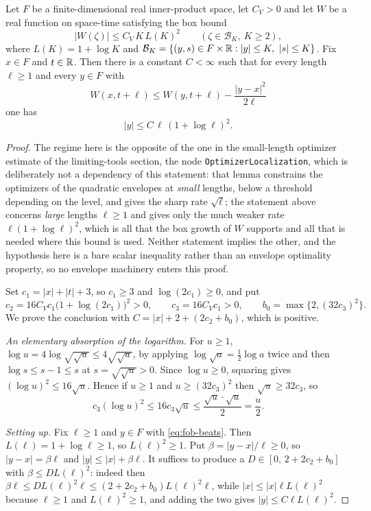 \begin{helper}
Let $F$ be a finite-dimensional real inner-product space, let $C_V>0$ and let
$W$ be a real function on space-time satisfying the box bound
\[
  |W(\zeta)|\le C_V\,K\,L(K)^2\qquad(\zeta\in\mathcal B_K,\ K\ge2),
\]
where $L(K)=1+\log K$ and
$\mathcal B_K=\{(y,s)\in F\times\mathbb{R}:|y|\le K,\ |s|\le K\}$. Fix $x\in F$ and
$t\in\mathbb{R}$. Then there is a constant $C<\infty$ such that for every length
$\ell\ge1$ and every $y\in F$ with
\begin{equation}\label{eq:fob-beats}
  W(x,t+\ell)\le W(y,t+\ell)-\frac{|y-x|^2}{2\ell}
\end{equation}
one has
\[
  |y|\le C\,\ell\,(1+\log\ell)^2 .
\]
\end{helper}
\begin{proof}
The regime here is the opposite of the one in the small-length optimizer
estimate of the limiting-tools section, the node \texttt{OptimizerLocalization},
which is deliberately not a dependency of this statement: that lemma constrains the optimizers of the quadratic envelopes at
\emph{small} lengths, below a threshold depending on the level, and gives the
sharp rate $\sqrt{\ell}$; the statement above concerns \emph{large} lengths
$\ell\ge1$ and gives only the much weaker rate $\ell(1+\log\ell)^2$, which is
all that the box growth of $W$ supports and all that is needed where this bound
is used. Neither statement implies the other, and the hypothesis here is a bare
scalar inequality rather than an envelope optimality property, so no envelope
machinery enters this proof.

Set $c_1=|x|+|t|+3$, so $c_1\ge3$ and $\log(2c_1)\ge0$, and put
\[
  c_2=16C_Vc_1\bigl(1+\log(2c_1)\bigr)^2>0,\qquad
  c_3=16C_Vc_1>0,\qquad
  b_0=\max\bigl\{2,(32c_3)^2\bigr\} .
\]
We prove the conclusion with $C=|x|+2+(2c_2+b_0)$, which is positive.

\emph{An elementary absorption of the logarithm.} For $u\ge1$,
$\log u=4\log\sqrt{\sqrt u}\le4\sqrt{\sqrt u}$, by applying
$\log\sqrt{a}=\tfrac12\log a$ twice and then $\log s\le s-1\le s$ at
$s=\sqrt{\sqrt u}>0$. Since $\log u\ge0$, squaring gives
$(\log u)^2\le16\sqrt u$. Hence if $u\ge1$ and $u\ge(32c_3)^2$ then
$\sqrt u\ge32c_3$, so
\begin{equation}\label{eq:fob-absorb}
  c_3(\log u)^2\le16c_3\sqrt u\le\frac{\sqrt u\cdot\sqrt u}{2}=\frac u2 .
\end{equation}

\emph{Setting up.} Fix $\ell\ge1$ and $y\in F$ with \eqref{eq:fob-beats}. Then
$L(\ell)=1+\log\ell\ge1$, so $L(\ell)^2\ge1$. Put $\beta=|y-x|/\ell\ge0$, so
$|y-x|=\beta\ell$ and $|y|\le|x|+\beta\ell$. It suffices to produce a
$D\in[0,\,2+2c_2+b_0]$ with $\beta\le DL(\ell)^2$: indeed then
$\beta\ell\le DL(\ell)^2\ell\le(2+2c_2+b_0)L(\ell)^2\ell$, while
$|x|\le|x|\ell L(\ell)^2$ because $\ell\ge1$ and $L(\ell)^2\ge1$, and adding
the two gives $|y|\le C\ell L(\ell)^2$.


\end{proof}
